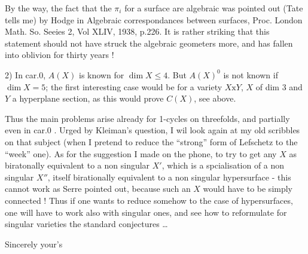 
By the way, the fact that the $\pi_i$ for a surface are algebraic was pointed out (Tate tells me) by Hodge in Algebraic correspondances between surfaces, Proc. London Math. So. Seeies 2, Vol XLIV, 1938, p.226. It is rather striking that this statement should not have struck the algebraic geometers more, and has fallen into oblivion for  thirty years !

2) In car.0, $A(X)$ is known for $\dim X\leq4$. But $A(X)^0$ is not known if $\dim X=5$; the first interesting case would be for a variety $X\mathrm{x}Y$, $X$ of dim 3 and $Y$ a hyperplane section, as this would prove $C(X)$, see above.

Thus the main problems arise already for 1-cycles on threefolds, and partially even in car.0 . Urged by Kleiman's question, I wil look again at my old scribbles on that subject (when I pretend to reduce the ``strong'' form of Lefschetz to the ``week'' one). As for the suggestion I made on the phone, to try to get any $X$ as biratonally equivalent to a non singular $X'$, which is a spcialisation of a non singular $X''$, itself birationally equivalent to a non singular hypersurface - this cannot work as Serre pointed out, because such an $X$ would have to be simply connected ! Thus if one wants to reduce somehow to the case of hypersurfaces, one will have to work also with singular ones, and see how to reformulate for singular varieties the standard conjectures \ldots

Sincerely your's

